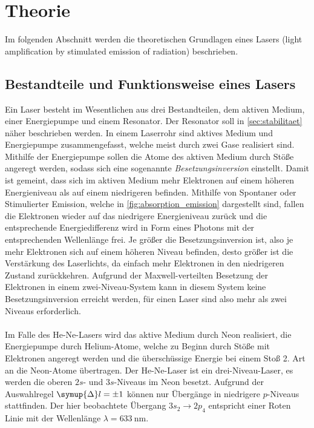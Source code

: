 \section{Theorie}
\label{sec:theorie}

    Im folgenden Abschnitt werden die theoretischen Grundlagen eines Lasers (light amplification by stimulated emission of radiation) beschrieben.

\subsection{Bestandteile und Funktionsweise eines Lasers}

    Ein Laser besteht im Wesentlichen aus drei Bestandteilen,
    dem aktiven Medium, einer Energiepumpe und einem Resonator.
    Der Resonator soll in \autoref{sec:stabilitaet} näher beschrieben werden.
    In einem Laserrohr sind aktives Medium und Energiepumpe zusammengefasst,
    welche meist durch zwei Gase realisiert sind.
    Mithilfe der Energiepumpe sollen die Atome des aktiven Medium durch Stöße angeregt werden,
    sodass sich eine sogenannte \textit{Besetzungsinversion} einstellt.
    Damit ist gemeint,
    dass sich im aktiven Medium mehr Elektronen auf einem höheren Energieniveau als auf einem niedrigeren befinden.
    Mithilfe von Spontaner oder Stimulierter Emission,
    welche in \autoref{fig:absorption_emission} dargestellt sind,
    fallen die Elektronen wieder auf das niedrigere Energieniveau zurück und die entsprechende Energiedifferenz wird in Form eines Photons mit der entsprechenden Wellenlänge frei.
    Je größer die Besetzungsinversion ist,
    also je mehr Elektronen sich auf einem höheren Niveau befinden,
    desto größer ist die Verstärkung des Laserlichts,
    da einfach mehr Elektronen in den niedrigeren Zustand zurückkehren.
    Aufgrund der Maxwell-verteilten Besetzung der Elektronen in einem zwei-Niveau-System kann in diesem System keine Besetzungsinversion erreicht werden,
    für einen Laser sind also mehr als zwei Niveaus erforderlich.\\
    \\
    Im Falle des He-Ne-Lasers wird das aktive Medium durch Neon realisiert,
    die Energiepumpe durch Helium-Atome,
    welche zu Beginn durch Stöße mit Elektronen angeregt werden und die überschüssige Energie bei einem Stoß 2. Art an die Neon-Atome übertragen.
    Der He-Ne-Laser ist ein drei-Niveau-Laser,
    es werden die oberen $2s$- und $3s$-Niveaus im Neon besetzt.
    Aufgrund der Auswahlregel $\symup{\Delta} l = \pm 1$ können nur Übergänge in niedrigere $p$-Niveaus stattfinden.
    Der hier beobachtete Übergang $3s_2 \to 2p_4$ entspricht einer Roten Linie mit der Wellenlänge $\lambda = \SI{633}{\nano\meter}$.

